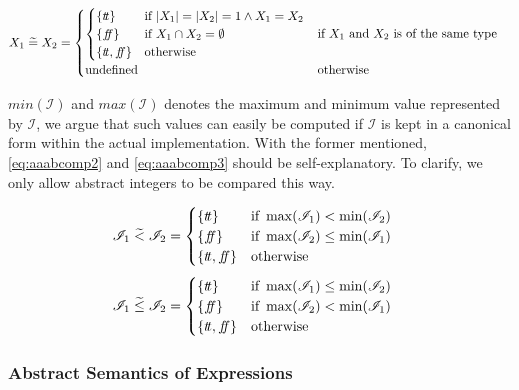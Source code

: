 \begin{align} \label{eq:aaabcomp}
    X_1 \;\aab{=}\; X_2 &= \begin{cases}
        \begin{cases}
        \{\true\} & \text{if } |X_1| = |X_2| = 1 \land X_1 = X_2 \\
        \{\false\} & \text{if } X_1 \cap X_2 = \emptyset \\
        \{\true, \false\} & \text{otherwise }
        \end{cases} & \text{if $X_1$ and $X_2$ is of the same type} \\
        \text{undefined} & \text{otherwise}
    \end{cases}
\end{align}

$min(\mathscr{I})$ and $max(\mathscr{I})$ denotes the maximum and minimum value represented by $\mathscr{I}$, we argue that such values can easily be computed if $\mathscr{I}$ is kept in a canonical form within the actual implementation.
With the former mentioned, \autoref{eq:aaabcomp2} and \ref{eq:aaabcomp3} should be self-explanatory.
To clarify, we only allow abstract integers to be compared this way.

\begin{align}\label{eq:aaabcomp2}
    \mathscr{I}_1 \;\aab{<}\; \mathscr{I}_2 &= \begin{cases}
        \{\true\} & \text{if } \max(\mathscr{I}_1) < \min(\mathscr{I}_2) \\
        \{\false\} & \text{if } \max(\mathscr{I}_2) \leq \min (\mathscr{I}_1) \\
        \{\true, \false\} & \text{otherwise}
    \end{cases}
\end{align}
\begin{align}\label{eq:aaabcomp3}
    \mathscr{I}_1 \;\aab{\leq}\; \mathscr{I}_2 &= \begin{cases}
        \{\true\} & \text{if } \max(\mathscr{I}_1) \leq \min(\mathscr{I}_2) \\
        \{\false\} & \text{if } \max(\mathscr{I}_2) < \min (\mathscr{I}_1) \\
        \{\true, \false\} & \text{otherwise}
    \end{cases}
\end{align}

\subsubsection{Abstract Semantics of Expressions}

